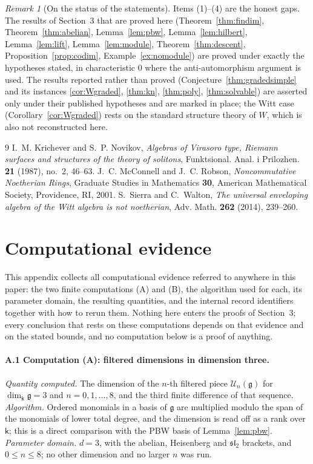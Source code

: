 \documentclass[11pt]{ctexart}
\theoremstyle{plain}
\theoremstyle{definition}
\theoremstyle{remark}
\newtheorem{remark}[theorem]{Remark}
\newcommand{\kk}{\mathsf{k}}
\newcommand{\gl}{\mathfrak{g}}
\newcommand{\UU}{\mathcal{U}}
\begin{document}
\begin{remark}[On the status of the statements]
Items (1)--(4) are the honest gaps. The results of Section~3 that are proved here
(Theorem~\ref{thm:findim}, Theorem~\ref{thm:abelian}, Lemma~\ref{lem:pbw},
Lemma~\ref{lem:hilbert}, Lemma~\ref{lem:lift}, Lemma~\ref{lem:module},
Theorem~\ref{thm:descent}, Proposition~\ref{prop:codim},
Example~\ref{ex:nomodule}) are proved under exactly the hypotheses stated, in
characteristic $0$ where the anti-automorphism argument is used. The results reported
rather than proved (Conjecture~\ref{thm:gradedsimple} and its instances
\ref{cor:Wgraded}, \ref{thm:kn}, \ref{thm:poly}, \ref{thm:solvable}) are asserted only
under their published hypotheses and are marked in place; the Witt case
(Corollary~\ref{cor:Wgraded}) rests on the standard structure theory of $W$, which is
also not reconstructed here.
\end{remark}

\begin{thebibliography}{9}
 I.~M. Krichever and S.~P. Novikov,
\emph{Algebras of Virasoro type, Riemann surfaces and structures of the theory of
solitons}, Funktsional. Anal. i Prilozhen. \textbf{21} (1987), no.~2, 46--63.
 J.~C. McConnell and J.~C. Robson,
\emph{Noncommutative Noetherian Rings}, Graduate Studies in Mathematics \textbf{30},
American Mathematical Society, Providence, RI, 2001.
 S.~Sierra and C.~Walton,
\emph{The universal enveloping algebra of the Witt algebra is not noetherian},
Adv. Math. \textbf{262} (2014), 239--260.
\end{thebibliography}

\appendix
\section{Computational evidence}\label{app:comp}

This appendix collects all computational evidence referred to anywhere in this paper:
the two finite computations (A) and (B), the algorithm used for each, its parameter
domain, the resulting quantities, and the internal record identifiers together with how
to rerun them. Nothing here enters the proofs of Section~3; every conclusion that
rests on these computations depends on that evidence and on the stated bounds, and no
computation below is a proof of anything.

\paragraph{A.1 Computation (A): filtered dimensions in dimension three.}
\emph{Quantity computed.} The dimension of the $n$-th filtered piece $\UU_n(\gl)$ for
$\dim_\kk\gl=3$ and $n=0,1,\dots,8$, and the third finite difference of that sequence.
\emph{Algorithm.} Ordered monomials in a basis of $\gl$ are multiplied modulo the span
of the monomials of lower total degree, and the dimension is read off as a rank over
$\kk$; this is a direct comparison with the PBW basis of Lemma~\ref{lem:pbw}.
\emph{Parameter domain.} $d=3$, with the abelian, Heisenberg and $\mathfrak{sl}_2$
brackets, and $0\le n\le8$; no other dimension and no larger $n$ was run.
\end{document}
